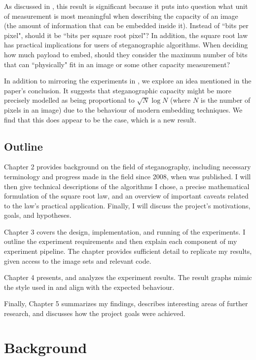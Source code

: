 \documentclass[11pt,a4paper,twoside,openright]{report}
\begin{document}
As discussed in \cite{2008-paper}, this result is significant because it puts into question what unit of measurement is most meaningful when describing the capacity of an image (the amount of information that can be embedded inside it). Instead of ``bits per pixel", should it be ``bits per square root pixel"? In addition, the square root law has practical implications for users of steganographic algorithms. When deciding how much payload to embed, should they consider the maximum number of bits that can ``physically" fit in an image or some other capacity measurement?

In addition to mirroring the experiments in \cite{2008-paper}, we explore an idea mentioned in the paper's conclusion. It suggests that steganographic capacity might be more precisely modelled as being proportional to $\sqrt{N} \log{N}$ (where $N$ is the number of pixels in an image) due to the behaviour of modern embedding techniques. We find that this does appear to be the case, which is a new result.


\section{Outline}

Chapter 2 provides background on the field of steganography, including necessary terminology and progress made in the field since 2008, when \cite{2008-paper} was published. I will then give technical descriptions of the algorithms I chose, a precise mathematical formulation of the square root law, and an overview of important caveats related to the law's practical application. Finally, I will discuss the project's motivations, goals, and hypotheses.

Chapter 3 covers the design, implementation, and running of the experiments. I outline the experiment requirements and then explain each component of my experiment pipeline. The chapter provides sufficient detail to replicate my results, given access to the image sets and relevant code.

Chapter 4 presents, and analyzes the experiment results. The result graphs mimic the style used in \cite{2008-paper} and align with the expected behaviour.

Finally, Chapter 5 summarizes my findings, describes interesting areas of further research, and discusses how the project goals were achieved.


\chapter{Background}
\end{document}
